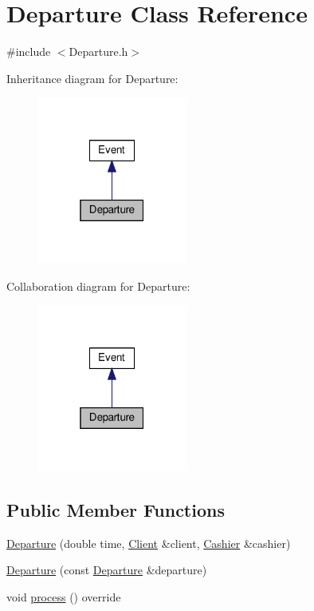 \hypertarget{classDeparture}{}\section{Departure Class Reference}
\label{classDeparture}


{\ttfamily \#include $<$Departure.\+h$>$}



Inheritance diagram for Departure\+:\nopagebreak
\begin{figure}[H]
\begin{center}
\leavevmode
\includegraphics[width=139pt]{classDeparture__inherit__graph}
\end{center}
\end{figure}


Collaboration diagram for Departure\+:\nopagebreak
\begin{figure}[H]
\begin{center}
\leavevmode
\includegraphics[width=139pt]{classDeparture__coll__graph}
\end{center}
\end{figure}
\subsection*{Public Member Functions}
\begin{DoxyCompactItemize}
\item 
\hyperlink{classDeparture_a6e0e7096d54c62c36110229266a8d37e}{Departure} (double time, \hyperlink{classClient}{Client} \&client, \hyperlink{classCashier}{Cashier} \&cashier)
\item 
\hyperlink{classDeparture_ade976c4ac1c737eded923e7e2adbf3f0}{Departure} (const \hyperlink{classDeparture}{Departure} \&departure)
\item 
void \hyperlink{classDeparture_a241611bdf4255d2ba868d58128dddc68}{process} () override
\end{DoxyCompactItemize}



